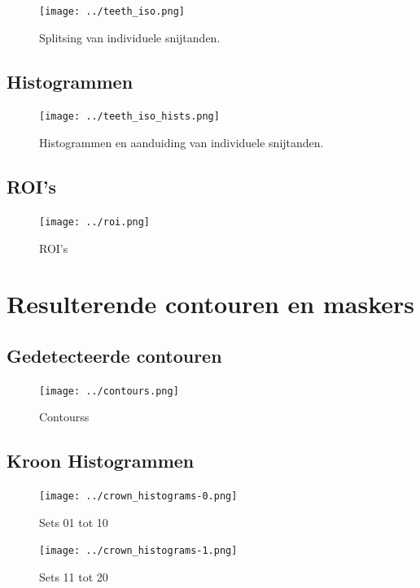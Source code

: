 \documentclass[10pt,a4paper]{article}
\begin{document}
\begin{figure}[H]
\centering
\texttt{[image: ../teeth\_iso.png]}
\caption{Splitsing van individuele snijtanden.}
\label{fig:teeth-isolation}
\end{figure}

\subsection{Histogrammen}
\label{appendix:teeth-isolation-hists}

\begin{figure}[H]
\centering
\texttt{[image: ../teeth\_iso\_hists.png]}
\caption{Histogrammen en aanduiding van individuele snijtanden.}
\label{fig:teeth-isolation-hists}
\end{figure}

\subsection{ROI's}
\label{appendix:rois}

\begin{figure}[H]
\centering
\texttt{[image: ../roi.png]}
\caption{ROI's}
\label{fig:rois}
\end{figure}

\section{Resulterende contouren en maskers}
\label{appendix:contours}

\subsection{Gedetecteerde contouren}

\begin{figure}[H]
\centering
\texttt{[image: ../contours.png]}
\caption{Contourss}
\label{fig:contours}
\end{figure}

\subsection{Kroon Histogrammen}
\label{appendix:crown_histograms}

\begin{figure}[H]
\centering
\texttt{[image: ../crown\_histograms-0.png]}
\caption{Sets 01 tot 10}
\label{fig:crown_histograms-0}
\end{figure}

\begin{figure}[H]
\centering
\texttt{[image: ../crown\_histograms-1.png]}
\caption{Sets 11 tot 20}
\label{fig:crown_histograms-1}
\end{figure}
\end{document}
